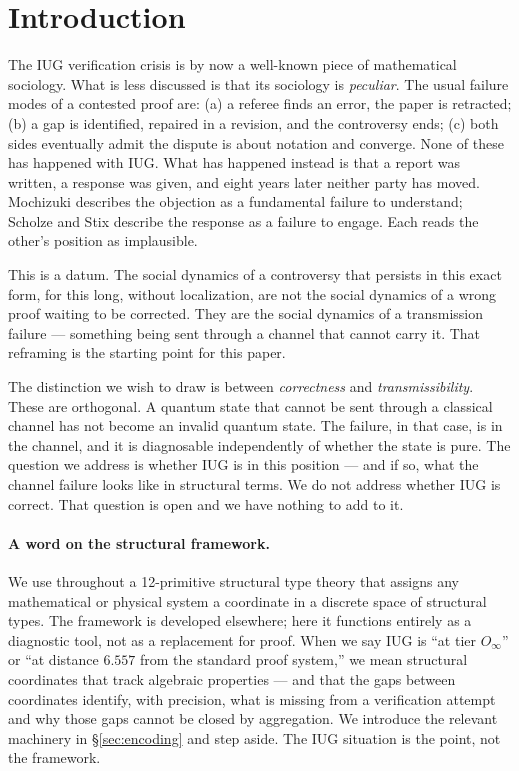 \documentclass[12pt]{article}
\theoremstyle{plain}
\theoremstyle{definition}
\theoremstyle{remark}
\begin{document}
\tableofcontents

\section{Introduction}
\label{sec:intro}

The IUG verification crisis is by now a well-known piece of mathematical sociology.
What is less discussed is that its sociology is \emph{peculiar}. The usual failure modes of
a contested proof are: (a) a referee finds an error, the paper is retracted; (b) a gap is
identified, repaired in a revision, and the controversy ends; (c) both sides eventually
admit the dispute is about notation and converge. None of these has happened with IUG.
What has happened instead is that a report was written, a response was given, and eight
years later neither party has moved. Mochizuki describes the objection as a fundamental
failure to understand; Scholze and Stix describe the response as a failure to engage.
Each reads the other's position as implausible.

This is a datum. The social dynamics of a controversy that persists in this exact form,
for this long, without localization, are not the social dynamics of a wrong proof waiting
to be corrected. They are the social dynamics of a transmission failure --- something being
sent through a channel that cannot carry it. That reframing is the starting point for
this paper.

The distinction we wish to draw is between \emph{correctness} and \emph{transmissibility}.
These are orthogonal. A quantum state that cannot be sent through a classical channel has
not become an invalid quantum state. The failure, in that case, is in the channel, and it
is diagnosable independently of whether the state is pure. The question we address is
whether IUG is in this position --- and if so, what the channel failure looks like in
structural terms. We do not address whether IUG is correct. That question is open and we
have nothing to add to it.

\paragraph{A word on the structural framework.}
We use throughout a 12-primitive structural type theory \cite{synthref} that assigns any
mathematical or physical system a coordinate in a discrete space of structural types.
The framework is developed elsewhere; here it functions entirely as a diagnostic tool,
not as a replacement for proof. When we say IUG is ``at tier $O_\infty$'' or ``at distance
$6.557$ from the standard proof system,'' we mean structural coordinates that track
algebraic properties --- and that the gaps between coordinates identify, with precision,
what is missing from a verification attempt and why those gaps cannot be closed by
aggregation. We introduce the relevant machinery in \S\ref{sec:encoding} and step aside.
The IUG situation is the point, not the framework.
\end{document}
